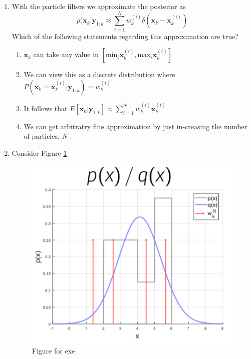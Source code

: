 \begin{enumerate}
\item With the particle filters we approximate the posterior as 
\begin{equation}
p(\mathbf{x}_k | \mathbf{y}_{1:k} \approx \sum_{i=1}^{N} w_{k}^{(i)}\delta(\mathbf{x}_k - \mathbf{x}_{k}^{(i)})
\end{equation}
Which of the following statements regarding this approximation are true?

\begin{enumerate}
\item $\mathbf{x}_k$ can take any value in $[\text{min}_i \mathbf{x}_{k}^{(i)},\text{max}_i \mathbf{x}_{k}^{(i)}]$
\item We can view this as a discrete distribution where $P(\mathbf{x}_{k} = \mathbf{x}_{k}^{(i)} | \mathbf{y}_{1:k}) = w_{k}^{(i)}$.
\item It follows that  $E[\mathbf{x}_{k} | \mathbf{y}_{1:k}] \approx \sum_{i=1}^{N} w_{k}^{(i)}\mathbf{x}_{k}^{(i)}$.
\item We can get arbitratry fine approximation by just in-creasing the number of particles, $N$ . 
\end{enumerate}

\item Consider Figure \ref{P6_importancesampling}

\begin{figure}[!htb]
\begin{center}
\includegraphics[scale=0.320]{img/particle_filters/P6_importancesampling.png}
\end{center}
\caption{Figure for exe}
\label{P6_importancesampling}
\end{figure}


\end{enumerate}
